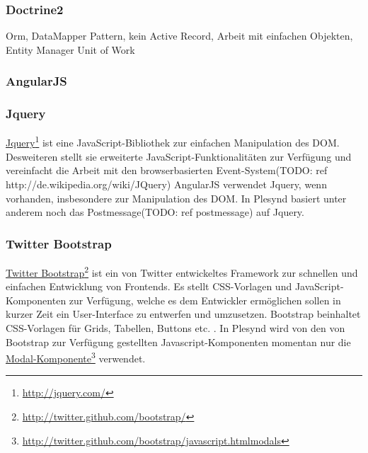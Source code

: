 \subsubsection{Doctrine2}
Orm, DataMapper Pattern, kein Active Record, Arbeit mit einfachen Objekten, Entity Manager Unit of Work


\subsubsection{AngularJS}

\subsubsection{Jquery}
\href{http://jquery.com/}{Jquery}\footnote{\url{http://jquery.com/}} ist eine JavaScript-Bibliothek zur einfachen Manipulation des DOM. Desweiteren stellt sie erweiterte JavaScript-Funktionalitäten zur Verfügung und vereinfacht die Arbeit mit den browserbasierten Event-System(TODO: ref http://de.wikipedia.org/wiki/JQuery) AngularJS verwendet Jquery, wenn vorhanden, insbesondere zur Manipulation des DOM. In Plesynd basiert unter anderem noch das Postmessage(TODO: ref postmessage) auf Jquery.  

\subsubsection{Twitter Bootstrap}
\href{http://twitter.github.com/bootstrap/}{Twitter Bootstrap}\footnote{\url{http://twitter.github.com/bootstrap/}} ist ein von Twitter entwickeltes Framework zur schnellen und einfachen Entwicklung von Frontends. Es stellt CSS-Vorlagen und JavaScript-Komponenten zur Verfügung, welche es dem Entwickler ermöglichen sollen in kurzer Zeit ein User-Interface zu entwerfen und umzusetzen. Bootstrap beinhaltet CSS-Vorlagen für Grids, Tabellen, Buttons etc. . In Plesynd wird von den von Bootstrap zur Verfügung gestellten Javascript-Komponenten momentan nur die \href{http://twitter.github.com/bootstrap/javascript.htmlmodals}{Modal-Komponente}\footnote{\url{http://twitter.github.com/bootstrap/javascript.htmlmodals}} verwendet. 